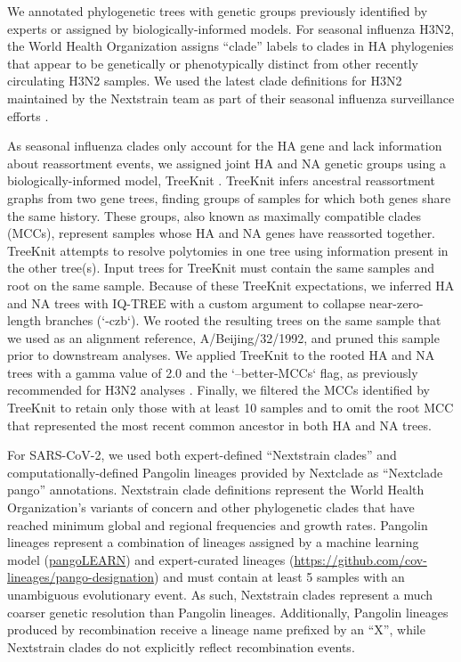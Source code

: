 \documentclass[10pt,letterpaper]{article}
\begin{document}
We annotated phylogenetic trees with genetic groups previously identified by experts or assigned by biologically-informed models.
For seasonal influenza H3N2, the World Health Organization assigns ``clade'' labels to clades in HA phylogenies that appear to be genetically or phenotypically distinct from other recently circulating H3N2 samples.
We used the latest clade definitions for H3N2 maintained by the Nextstrain team as part of their seasonal influenza surveillance efforts \cite{Neher2015}.

As seasonal influenza clades only account for the HA gene and lack information about reassortment events, we assigned joint HA and NA genetic groups using a biologically-informed model, TreeKnit \cite{Barrat-Charlaix2022}.
TreeKnit infers ancestral reassortment graphs from two gene trees, finding groups of samples for which both genes share the same history.
These groups, also known as maximally compatible clades (MCCs), represent samples whose HA and NA genes have reassorted together.
TreeKnit attempts to resolve polytomies in one tree using information present in the other tree(s).
Input trees for TreeKnit must contain the same samples and root on the same sample.
Because of these TreeKnit expectations, we inferred HA and NA trees with IQ-TREE with a custom argument to collapse near-zero-length branches (`-czb`).
We rooted the resulting trees on the same sample that we used as an alignment reference, A/Beijing/32/1992, and pruned this sample prior to downstream analyses.
We applied TreeKnit to the rooted HA and NA trees with a gamma value of 2.0 and the `--better-MCCs` flag, as previously recommended for H3N2 analyses \cite{Barrat-Charlaix2022}.
Finally, we filtered the MCCs identified by TreeKnit to retain only those with at least 10 samples and to omit the root MCC that represented the most recent common ancestor in both HA and NA trees.

For SARS-CoV-2, we used both expert-defined ``Nextstrain clades'' \cite{Hodcroft2020,Bedford2021,Roemer2022} and computationally-defined Pangolin lineages \cite{OToole2021} provided by Nextclade as ``Nextclade pango'' annotations.
Nextstrain clade definitions represent the World Health Organization's variants of concern and other phylogenetic clades that have reached minimum global and regional frequencies and growth rates.
Pangolin lineages represent a combination of lineages assigned by a machine learning model (\href{https://cov-lineages.org/resources/pangolin/pangolearn.html}{pangoLEARN}) and expert-curated lineages (\href{https://github.com/cov-lineages/pango-designation}{https://github.com/cov-lineages/pango-designation}) and must contain at least 5 samples with an unambiguous evolutionary event.
As such, Nextstrain clades represent a much coarser genetic resolution than Pangolin lineages.
Additionally, Pangolin lineages produced by recombination receive a lineage name prefixed by an ``X'', while Nextstrain clades do not explicitly reflect recombination events.
\end{document}
